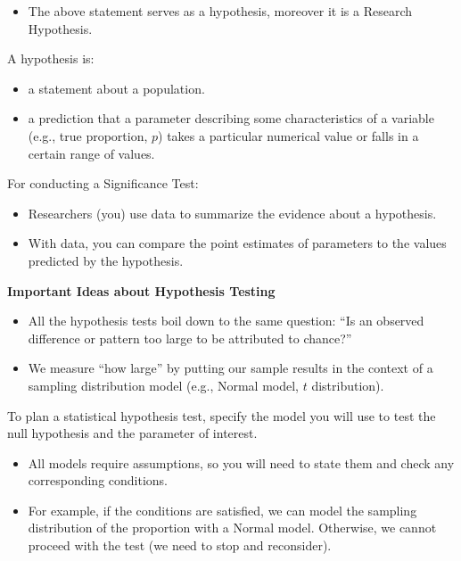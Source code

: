 \begin{itemize}
  \item The above statement serves as a hypothesis, moreover it is a Research Hypothesis.
\end{itemize}

A hypothesis is:

\begin{itemize}
  \item a statement about a population.
  \item a prediction that a parameter describing some characteristics of a variable (e.g., true proportion, $p$) takes a particular numerical value or falls in a certain range of values.
\end{itemize}

\vspace{1em}

For conducting a Significance Test:

\begin{itemize}
  \item Researchers (you) use data to summarize the evidence about a hypothesis.
  \item With data, you can compare the point estimates of parameters to the values predicted by the hypothesis.
\end{itemize}

\vspace{1em}

\textbf{Important Ideas about Hypothesis Testing}

\begin{itemize}
  \item All the hypothesis tests boil down to the same question: “Is an observed difference or pattern too large to be attributed to chance?”
  \item We measure “how large” by putting our sample results in the context of a sampling distribution model (e.g., Normal model, $t$ distribution).
\end{itemize}

\vspace{1em}

To plan a statistical hypothesis test, specify the model you will use to test the null hypothesis and the parameter of interest.

\begin{itemize}
  \item All models require assumptions, so you will need to state them and check any corresponding conditions.
  \item For example, if the conditions are satisfied, we can model the sampling distribution of the proportion with a Normal model. Otherwise, we cannot proceed with the test (we need to stop and reconsider).
\end{itemize}
